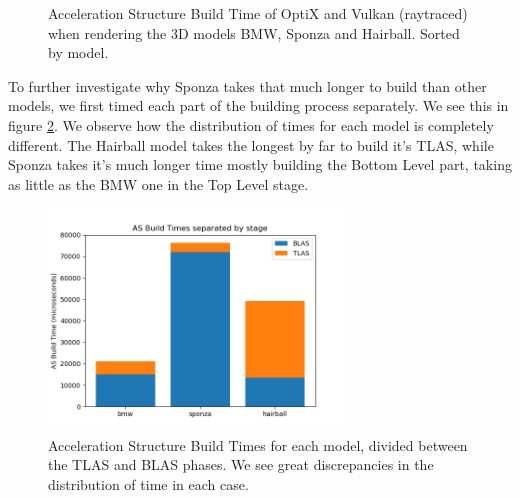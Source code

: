 \begin{figure}
    \caption{Acceleration Structure Build Time of OptiX and Vulkan (raytraced) when rendering the 3D models BMW, Sponza and Hairball. Sorted by model.}
    \label{as-build-time-geometry-comparison-graph}
\end{figure}

To further investigate why Sponza takes that much longer to build than other models, we first timed each part of the building process separately. We see this in figure \ref{as-build-time-decomposed}. We observe how the distribution of times for each model is completely different. The Hairball model takes the longest by far to build it's TLAS, while Sponza takes it's much longer time mostly building the Bottom Level part, taking as little as the BMW one in the Top Level stage.

\begin{figure}[hbt!]
    \centering
    \includegraphics[width=0.7\textwidth]{figuras/optix-accelbuildtimes-decomposed.png}
    \caption{Acceleration Structure Build Times for each model, divided between the TLAS and BLAS phases. We see great discrepancies in the distribution of time in each case.}
    \label{as-build-time-decomposed}
\end{figure}

